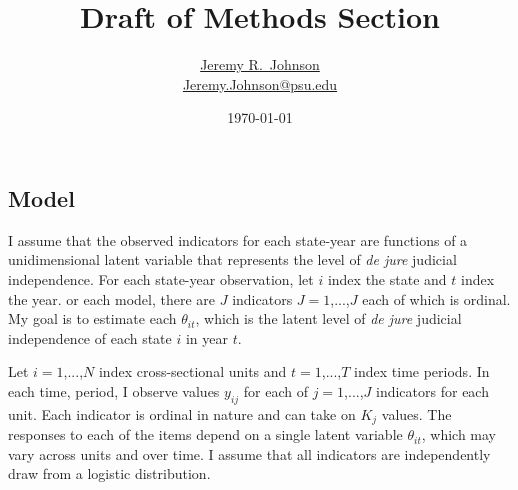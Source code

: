 \documentclass[12pt]{article}
\title{Draft of Methods Section}
\author{\href{http://www.jeremyrjohnson.org/}{Jeremy R.\ Johnson}\\ \href{mailto:Jeremy.Johnson@psu.edu}{Jeremy.Johnson@psu.edu}}
\affil{Pennsylvania State University}
\date{\today}
\begin{document}
\maketitle
\thispagestyle{empty}

\doublespacing
\setcounter{page}{1}
\subsection*{Model}
I assume that the observed indicators for each state-year are functions of a unidimensional latent variable that represents the level of \textit{de jure} judicial independence.  For each state-year observation, let $i$ index the state and $t$ index the year.  or each model, there are $J$ indicators $J=1$,...,$J$ each of which is ordinal. My goal is to estimate each $\theta_{it}$, which is the latent level of \textit{de jure} judicial independence of each state $i$ in year $t$.

Let $i=1$,...,$N$ index cross-sectional units and $t=1$,...,$T$ index time periods.  In each time, period, I observe values $y_{ij}$ for each of $j=1$,...,$J$ indicators for each unit.  Each indicator is ordinal in nature and can take on $K_j$ values.  The responses to each of the items depend on a single latent variable $\theta_{it}$, which may vary across units and over time. I assume that all indicators are independently draw from a logistic distribution.  
\end{document}
